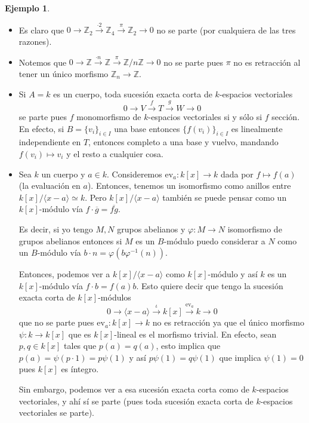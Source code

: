 \documentclass[12pt]{book}
\theoremstyle{definition}
\newtheorem{ex}[teo]{Ejemplo}
\newcommand{\ZZ}{\mathbb{Z}}      %
\begin{document}
\begin{ex}\begin{itemize}
\item Es claro que $0\longrightarrow \ZZ_2 \stackrel{\cdot 2}{\longrightarrow} \ZZ_4 \stackrel{\pi}{\longrightarrow} \ZZ_2\longrightarrow 0$ no se parte (por cualquiera de las tres razones).

\item Notemos que $0\longrightarrow \ZZ\stackrel{\cdot n}{\longrightarrow}\ZZ \stackrel{\pi}{\longrightarrow} \ZZ/n\ZZ \longrightarrow 0$ no se parte pues $\pi$ no es retracción al tener un único morfismo $\ZZ_n\to \ZZ$.

\item Si $A=k$ es un cuerpo, toda sucesión exacta corta de $k$-espacios vectoriales $$0\longrightarrow V\stackrel{f}{\longrightarrow}T\stackrel{g}{\longrightarrow}W\longrightarrow 0$$ se parte pues $f$ monomorfismo de $k$-espacios vectoriales si y sólo si $f$ sección. En efecto, si $B=\{v_i\}_{i\in I}$ una base entonces $\{f(v_i)\}_{i\in I}$ es linealmente independiente en $T$, entonces completo a una base y vuelvo, mandando $f(v_i)\mapsto v_i$ y el resto a cualquier cosa.

\item Sea $k$ un cuerpo y $a\in k$. Consideremos $\mathrm{ev}_a:k[x]\to k$ dada por $f\mapsto f(a)$ (la evaluación en $a$). Entonces, tenemos un isomorfismo como anillos entre $k[x]/\langle x-a\rangle \simeq k$. Pero $k[x]/\langle x-a\rangle$ también se puede pensar como un $k[x]$-módulo vía $f\cdot \overline{g} = \overline{fg}$. 

Es decir, si yo tengo $M,N$ grupos abelianos y $\varphi:M\to N$ isomorfismo de grupos abelianos entonces si $M$ es un $B$-módulo puedo considerar a $N$ como un $B$-módulo vía $b\cdot n = \varphi(b\varphi^{-1}(n))$.

Entonces, podemos ver a $k[x]/\langle x-a\rangle$ como $k[x]$-módulo y así $k$ es un $k[x]$-módulo vía $f\cdot b = f(a)b$. Esto quiere decir que tengo la sucesión exacta corta de $k[x]$-módulos $$0\longrightarrow \langle x-a\rangle \stackrel{\iota}{\longrightarrow} k[x]\stackrel{\mathrm{ev}_a}{\longrightarrow} k \longrightarrow 0$$ que no se parte pues $\mathrm{ev}_a:k[x]\to k$ no es retracción ya que el único morfismo $\psi:k\to k[x]$ que es $k[x]$-lineal es el morfismo trivial. En efecto, sean $p,q\in k[x]$ tales que $p(a)=q(a)$, esto implica que $p(a) = \psi(p\cdot 1) = p\psi(1)$ y así $p\psi(1) = q\psi(1)$ que implica $\psi(1)=0$ pues $k[x]$ es íntegro.

Sin embargo, podemos ver a esa sucesión exacta corta como de $k$-espacios vectoriales, y ahí sí se parte (pues toda sucesión exacta corta de $k$-espacios vectoriales se parte).

\end{itemize}
\end{ex}
\end{document}

